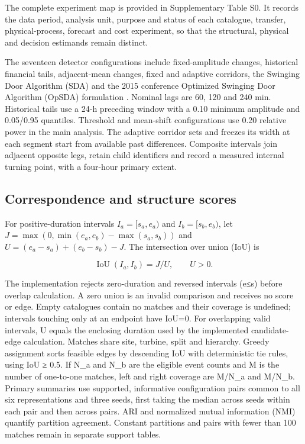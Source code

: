 \documentclass[preprint,12pt]{elsarticle}
\begin{document}
The complete experiment map is provided in Supplementary Table S0. It records the data period, analysis unit, purpose and status of each catalogue, transfer, physical-process, forecast and cost experiment, so that the structural, physical and decision estimands remain distinct.

The seventeen detector configurations include fixed-amplitude changes, historical financial tails, adjacent-mean changes, fixed and adaptive corridors, the Swinging Door Algorithm (SDA) and the 2015 conference Optimized Swinging Door Algorithm (OpSDA) formulation \citep{florita2013, cui2015}. Nominal lags are 60, 120 and 240 min. Historical tails use a 24-h preceding window with a 0.10 minimum amplitude and 0.05/0.95 quantiles. Threshold and mean-shift configurations use 0.20 relative power in the main analysis. The adaptive corridor sets and freezes its width at each segment start from available past differences. Composite intervals join adjacent opposite legs, retain child identifiers and record a measured internal turning point, with a four-hour primary extent.

\subsection{Correspondence and structure scores}\label{correspondence-and-structure-scores}

For positive-duration intervals \(I_a=[s_a,e_a)\) and \(I_b=[s_b,e_b)\), let \(J=\max(0,\min(e_a,e_b)-\max(s_a,s_b))\) and \(U=(e_a-s_a)+(e_b-s_b)-J\). The intersection over union (IoU) is

\[
\operatorname{IoU}(I_a,I_b)=J/U,\qquad U>0.
\]

The implementation rejects zero-duration and reversed intervals (e≤s) before overlap calculation. A zero union is an invalid comparison and receives no score or edge. Empty catalogues contain no matches and their coverage is undefined; intervals touching only at an endpoint have IoU=0. For overlapping valid intervals, U equals the enclosing duration used by the implemented candidate-edge calculation. Matches share site, turbine, split and hierarchy. Greedy assignment sorts feasible edges by descending IoU with deterministic tie rules, using IoU ≥ 0.5. If N\_a and N\_b are the eligible event counts and M is the number of one-to-one matches, left and right coverage are M/N\_a and M/N\_b. Primary summaries use supported, informative configuration pairs common to all six representations and three seeds, first taking the median across seeds within each pair and then across pairs. ARI \citep{hubert1985} and normalized mutual information (NMI) quantify partition agreement. Constant partitions and pairs with fewer than 100 matches remain in separate support tables.
\end{document}
